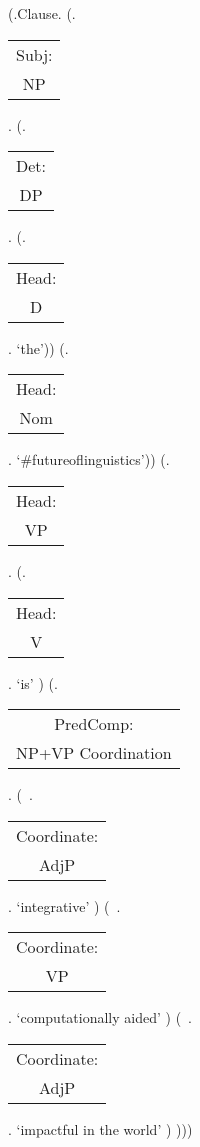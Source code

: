\documentclass[12pt]{standalone}
\newcommand{\NL}[2]{\begin{tabular}[t]{c}\small\textsf{#1:}\\
#2\end{tabular}}
\begin{document}
\begin{parsetree}
(.Clause.
	(.\NL{Subj}{NP}. 
	(.\NL{Det}{DP}. 
	(.\NL{Head}{D}. `the'))
	(.\NL{Head}{Nom}. `\#futureoflinguistics'))
	(.\NL{Head}{VP}.
	(.\NL{Head}{V}. `is' )
	(.\NL{PredComp}{NP+VP Coordination}. 
	(~.\NL{Coordinate}{AdjP}. `integrative' )
	(~.\NL{Coordinate}{VP}. `computationally aided' )
	(~.\NL{Coordinate}{AdjP}. `impactful in the world' )
	)))
\end{parsetree}
\end{document}
